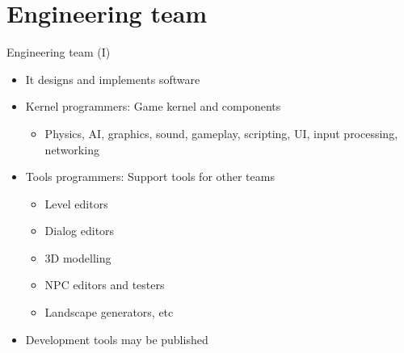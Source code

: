 \documentclass[10pt,compress]{beamer} %
\begin{document}
\section{Engineering team}
\begin{frame}{Engineering team (I)}
	\begin{itemize}
	\item It designs and implements software
		\item Kernel programmers: Game kernel and components
			\begin{itemize}
			\item Physics, AI, graphics, sound, gameplay, scripting, UI, input processing, networking
			\end{itemize}
		\item Tools programmers: Support tools for other teams 
			\begin{itemize}
			\item Level editors
			\item Dialog editors
			\item 3D modelling
			\item NPC editors and testers
			\item Landscape generators, etc
			\end{itemize}
	\item Development tools may be published
	\end{itemize}
\end{frame}
\end{document}
